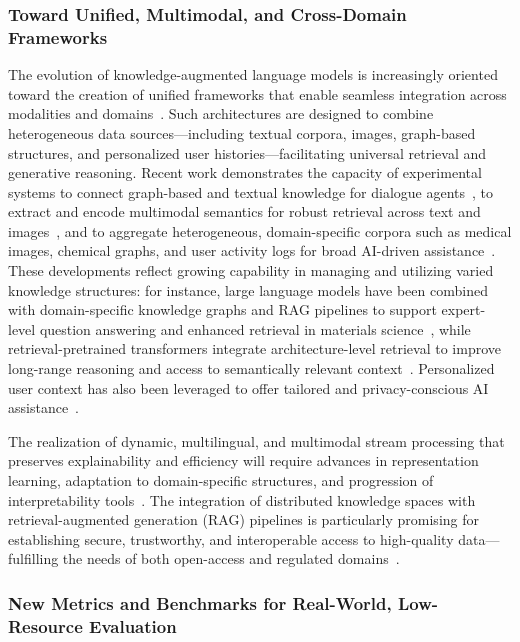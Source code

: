 \documentclass[sigconf]{acmart}
\begin{document}
\subsubsection{Toward Unified, Multimodal, and Cross-Domain Frameworks}

The evolution of knowledge-augmented language models is increasingly oriented toward the creation of unified frameworks that enable seamless integration across modalities and domains~\cite{ref61,ref62,ref63,ref64}. Such architectures are designed to combine heterogeneous data sources—including textual corpora, images, graph-based structures, and personalized user histories—facilitating universal retrieval and generative reasoning. Recent work demonstrates the capacity of experimental systems to connect graph-based and textual knowledge for dialogue agents~\cite{ref29}, to extract and encode multimodal semantics for robust retrieval across text and images~\cite{ref43,ref62}, and to aggregate heterogeneous, domain-specific corpora such as medical images, chemical graphs, and user activity logs for broad AI-driven assistance~\cite{ref5,ref14,ref36,ref54}. These developments reflect growing capability in managing and utilizing varied knowledge structures: for instance, large language models have been combined with domain-specific knowledge graphs and RAG pipelines to support expert-level question answering and enhanced retrieval in materials science~\cite{ref29}, while retrieval-pretrained transformers integrate architecture-level retrieval to improve long-range reasoning and access to semantically relevant context~\cite{ref14}. Personalized user context has also been leveraged to offer tailored and privacy-conscious AI assistance~\cite{ref36}.

The realization of dynamic, multilingual, and multimodal stream processing that preserves explainability and efficiency will require advances in representation learning, adaptation to domain-specific structures, and progression of interpretability tools~\cite{ref43,ref54}. The integration of distributed knowledge spaces with retrieval-augmented generation (RAG) pipelines is particularly promising for establishing secure, trustworthy, and interoperable access to high-quality data—fulfilling the needs of both open-access and regulated domains~\cite{ref62,ref63,ref64}.

\subsubsection{New Metrics and Benchmarks for Real-World, Low-Resource Evaluation}
\end{document}
